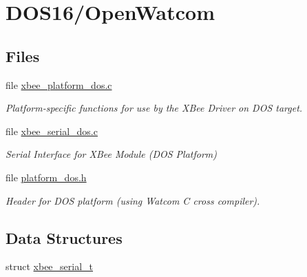 \hypertarget{group__hal__dos}{}\section{D\+O\+S16/\+Open\+Watcom}
\label{group__hal__dos}
\subsection*{Files}
\begin{DoxyCompactItemize}
\item 
file \hyperlink{xbee__platform__dos_8c}{xbee\+\_\+platform\+\_\+dos.\+c}
\begin{DoxyCompactList}\small\item\em Platform-\/specific functions for use by the X\+Bee Driver on D\+OS target. \end{DoxyCompactList}\item 
file \hyperlink{xbee__serial__dos_8c}{xbee\+\_\+serial\+\_\+dos.\+c}
\begin{DoxyCompactList}\small\item\em Serial Interface for X\+Bee Module (D\+OS Platform) \end{DoxyCompactList}\item 
file \hyperlink{platform__dos_8h}{platform\+\_\+dos.\+h}
\begin{DoxyCompactList}\small\item\em Header for D\+OS platform (using Watcom C cross compiler). \end{DoxyCompactList}\end{DoxyCompactItemize}
\subsection*{Data Structures}
\begin{DoxyCompactItemize}
\item 
struct \hyperlink{structxbee__serial__t}{xbee\+\_\+serial\+\_\+t}
\end{DoxyCompactItemize}
